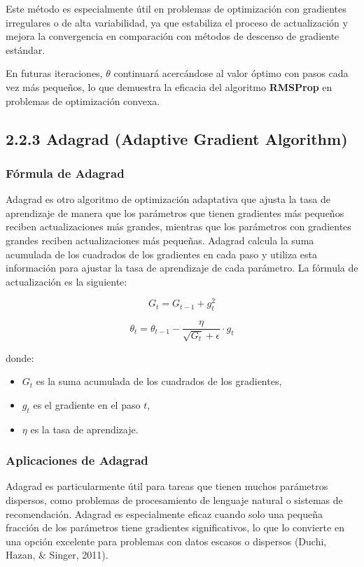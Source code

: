 \documentclass[a5paper]{article}
\begin{document}
	Este método es especialmente útil en problemas de optimización con gradientes irregulares o de alta variabilidad, ya que estabiliza el proceso de actualización y mejora la convergencia en comparación con métodos de descenso de gradiente estándar.
	
	En futuras iteraciones, \( \theta \) continuará acercándose al valor óptimo con pasos cada vez más pequeños, lo que demuestra la eficacia del algoritmo \textbf{RMSProp} en problemas de optimización convexa.
	
	\subsection*{2.2.3 Adagrad (Adaptive Gradient Algorithm)}
	
	\subsubsection*{Fórmula de Adagrad}
	
	Adagrad es otro algoritmo de optimización adaptativa que ajusta la tasa de aprendizaje de manera que los parámetros que tienen gradientes más pequeños reciben actualizaciones más grandes, mientras que los parámetros con gradientes grandes reciben actualizaciones más pequeñas. Adagrad calcula la suma acumulada de los cuadrados de los gradientes en cada paso y utiliza esta información para ajustar la tasa de aprendizaje de cada parámetro. La fórmula de actualización es la siguiente:
	
	\[
	G_t = G_{t-1} + g_t^2
	\]
	
	\[
	\theta_t = \theta_{t-1} - \frac{\eta}{\sqrt{G_t} + \epsilon} \cdot g_t
	\]
	
	donde:
	\begin{itemize}
		\item \( G_t \) es la suma acumulada de los cuadrados de los gradientes,
		\item \( g_t \) es el gradiente en el paso \( t \),
		\item \( \eta \) es la tasa de aprendizaje.
	\end{itemize}
	
	\subsubsection*{Aplicaciones de Adagrad}
	
	Adagrad es particularmente útil para tareas que tienen muchos parámetros dispersos, como problemas de procesamiento de lenguaje natural o sistemas de recomendación. Adagrad es especialmente eficaz cuando solo una pequeña fracción de los parámetros tiene gradientes significativos, lo que lo convierte en una opción excelente para problemas con datos escasos o dispersos (Duchi, Hazan, \& Singer, 2011).
	
\end{document}
